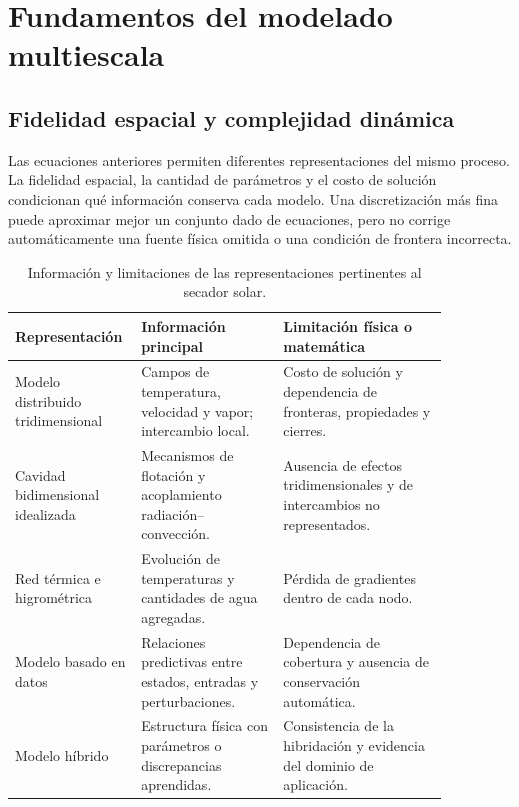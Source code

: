 \section{Fundamentos del modelado multiescala}
\label{sec:modelado_multiescala}
\suppressfloats[t]

\subsection{Fidelidad espacial y complejidad dinámica}
\label{subsec:jerarquia_modelos}

Las ecuaciones anteriores permiten diferentes representaciones del mismo proceso. La fidelidad espacial, la cantidad de parámetros y el costo de solución condicionan qué información conserva cada modelo. Una discretización más fina puede aproximar mejor un conjunto dado de ecuaciones, pero no corrige automáticamente una fuente física omitida o una condición de frontera incorrecta.

\begin{table}[htbp]
\centering
\small
\caption{Información y limitaciones de las representaciones pertinentes al secador solar.}
\label{tab:jerarquia_conceptual_modelos}
\begin{tabular}{p{0.19\linewidth}p{0.31\linewidth}p{0.36\linewidth}}
\toprule
Representación & Información principal & Limitación física o matemática \\
\midrule
Modelo distribuido tridimensional & Campos de temperatura, velocidad y vapor; intercambio local. & Costo de solución y dependencia de fronteras, propiedades y cierres. \\
Cavidad bidimensional idealizada & Mecanismos de flotación y acoplamiento radiación--convección. & Ausencia de efectos tridimensionales y de intercambios no representados. \\
Red térmica e higrométrica & Evolución de temperaturas y cantidades de agua agregadas. & Pérdida de gradientes dentro de cada nodo. \\
Modelo basado en datos & Relaciones predictivas entre estados, entradas y perturbaciones. & Dependencia de cobertura y ausencia de conservación automática. \\
Modelo híbrido & Estructura física con parámetros o discrepancias aprendidas. & Consistencia de la hibridación y evidencia del dominio de aplicación. \\
\bottomrule
\end{tabular}
\end{table}

